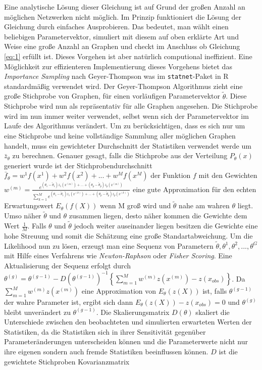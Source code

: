 \documentclass[a4paper,ngerman,oneside,titlepage,bibliography=totoc,11pt]{scrreprt}
\begin{document}
Eine analytische Lösung dieser Gleichung ist auf Grund der großen Anzahl an möglichen Netzwerken nicht möglich. Im Prinzip funktioniert die Lösung der Gleichung durch einfaches Ausprobieren. Das bedeutet, man wählt einen beliebigen Parametervektor, simuliert mit diesem auf oben erklärte Art und Weise eine große Anzahl an Graphen und checkt im Anschluss ob Gleichung \ref{eq:1} erfüllt ist. Dieses Vorgehen ist aber natürlich computional ineffizient. Eine Möglichkeit zur effizienteren Implementierung dieses Vorgehens bietet das \emph{Importance Sampling} nach Geyer-Thompson was im \texttt{statnet}-Paket \citep{pack:statnet} in R  \citep{R} standardmäßig verwendet wird. Der Geyer-Thompson Algorithmus zieht eine große Stichprobe von Graphen, für einen vorläufigen Parametervektor $\widetilde{\theta}$. Diese Stichprobe wird nun als repräsentativ für alle Graphen angesehen. Die Stichprobe wird im nun immer weiter verwendet, selbst wenn sich der Parametervektor im Laufe des Algorithmus verändert. Um zu berücksichtigen, dass es sich nur um eine Stichprobe und keine vollständige Sammlung aller möglichen Graphen handelt, muss ein gewichteter Durchschnitt der Statistiken verwendet werde um $\bar{z}_\theta$ zu berechnen. Genauer gesagt, falls die Stichprobe aus der Verteilung $P_\theta(x)$ generiert wurde ist der Stichprobendurchschnitt $\bar{f}_\theta = w^1 f(x^1) + w^2 f(x^2) + ... + w^M f(x^M)$ der Funktion $f$ mit den Gewichten $w^{(m)} = \frac{e^{(\theta_1-\widetilde{\theta}_1)z_1(x^{(m)})+...+(\theta_p-\widetilde{\theta}_p)z_p(x^{(m)})}}{\sum_{k=1}^{M}{e^{(\theta_1-\widetilde{\theta}_1)z_1(x^{(k)})+...+(\theta_p-\widetilde{\theta}_p)z_p(x^{(k)})}}}$ 
eine gute Approximation für den echten Erwartungswert $E_\theta(f(X))$ wenn M groß wird und $\widetilde{\theta}$ nahe am wahren $\theta$ liegt. Umso näher $\widetilde{\theta}$ und $\theta$ zusammen liegen, desto näher kommen die Gewichte dem Wert $\frac{1}{M}$. Falls $\theta$ und $\widetilde{\theta}$ jedoch weiter auseinander liegen besitzen die Gewichte eine hohe Streuung und somit die Schätzung eine große Standartabweichung.
Um die Likelihood nun zu lösen, erzeugt man eine Sequenz von Parametern $\widetilde{\theta},\theta^{1}, \theta^{2},...,\theta^{G}$ mit Hilfe eines Verfahrens wie \emph{Newton-Raphson} oder \emph{Fisher Scoring}. Eine Aktualisierung der Sequenz erfolgt durch $\theta^{(g)} = \theta^{(g-1)} - {D(\theta^{(g-1)})}^{-1}\left\{\sum^{M}_{m = 1}{w^{(m)}z(x^{(m)})} - z(x_{obs})\right\}$. Da $\sum^{M}_{m = 1}{w^{(m)}z(x^{(m)})}$ eine Approximation von $E_\theta(z(X))$ ist, falls $\theta^{(g-1)}$ der wahre Parameter ist, ergibt sich dann $E_\theta(z(X)) - z(x_{obs}) = 0$ und $\theta^{(g)}$ bleibt unverändert zu $\theta^{(g-1)}$. Die Skalierungsmatrix $D(\theta)$ skaliert die Unterschiede zwischen den beobachteten und simulierten erwarteten Werten der Statistiken, da die Statistiken sich in ihrer Sensitivität gegenüber Parameteränderungen unterscheiden können und die Parameterwerte nicht nur ihre eigenen sondern auch fremde Statistiken beeinflussen können. $D$ ist die gewichtete Stichproben Kovarianzmatrix 
\end{document}
